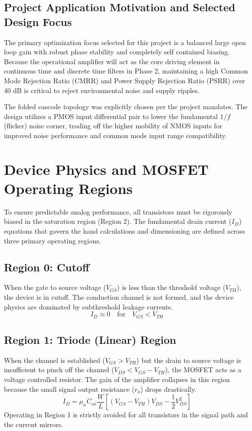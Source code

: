 \documentclass[conference]{IEEEtran}
\begin{document}
\subsection{Project Application Motivation and Selected Design Focus}
The primary optimization focus selected for this project is a balanced large open loop gain with robust phase stability and completely self contained biasing. Because the operational amplifier will act as the core driving element in continuous time and discrete time filters in Phase 2, maintaining a high Common Mode Rejection Ratio (CMRR) and Power Supply Rejection Ratio (PSRR) over 40 dB is critical to reject environmental noise and supply ripples. 

The folded cascode topology was explicitly chosen per the project mandates. The design utilizes a PMOS input differential pair to lower the fundamental $1/f$ (flicker) noise corner, trading off the higher mobility of NMOS inputs for improved noise performance and common mode input range compatibility.

\section{Device Physics and MOSFET Operating Regions}
To ensure predictable analog performance, all transistors must be rigorously biased in the saturation region (Region 2). The fundamental drain current ($I_D$) equations that govern the hand calculations and dimensioning are defined across three primary operating regions.

\subsection{Region 0: Cutoff}
When the gate to source voltage ($V_{GS}$) is less than the threshold voltage ($V_{TH}$), the device is in cutoff. The conduction channel is not formed, and the device physics are dominated by subthreshold leakage currents.
\begin{equation}
    I_D \approx 0 \quad \text{for} \quad V_{GS} < V_{TH}
\end{equation}

\subsection{Region 1: Triode (Linear) Region}
When the channel is established ($V_{GS} > V_{TH}$) but the drain to source voltage is insufficient to pinch off the channel ($V_{DS} < V_{GS} - V_{TH}$), the MOSFET acts as a voltage controlled resistor. The gain of the amplifier collapses in this region because the small signal output resistance ($r_o$) drops drastically.
\begin{equation}
    I_D = \mu_n C_{ox} \frac{W}{L} \left[ (V_{GS} - V_{TH})V_{DS} - \frac{1}{2}V_{DS}^2 \right]
\end{equation}
Operating in Region 1 is strictly avoided for all transistors in the signal path and the current mirrors.
\end{document}
